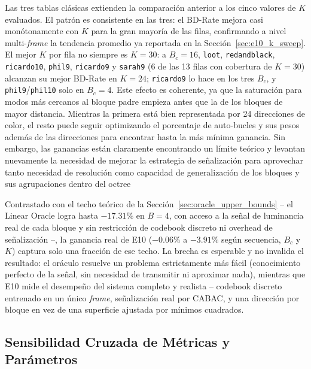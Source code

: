         Las tres tablas clásicas extienden la comparación anterior a los cinco valores de $K$
        evaluados. El patrón es consistente en las tres: el BD-Rate mejora casi monótonamente con
        $K$ para la gran mayoría de las filas, 
        confirmando a nivel multi-\textit{frame} la tendencia promedio ya reportada en la
        Sección~\ref{sec:e10_k_sweep}. El mejor $K$ por fila no siempre es $K=30$: a $B_c=16$, \texttt{loot}, \texttt{redandblack}, \texttt{ricardo10}, \texttt{phil9}, \texttt{ricardo9} y \texttt{sarah9} (6 de las 13 filas con cobertura de $K=30$) alcanzan su mejor BD-Rate en $K=24$; \texttt{ricardo9} lo hace en los tres $B_c$, y \texttt{phil9}/\texttt{phil10} solo en $B_c=4$. Este efecto es coherente, ya que la saturación para modos más cercanos al bloque padre empieza antes que la de los bloques de mayor distancia. Mientras la primera está bien representada por 24 direcciones de color, el resto puede seguir optimizando el porcentaje de auto-bucles y sus pesos además de las direcciones para encontrar hasta la más mínima ganancia. Sin embargo, las ganancias están claramente encontrando un límite teórico y levantan nuevamente la necesidad de mejorar la estrategia de señalización para aprovechar tanto necesidad de resolución como capacidad de generalización de los bloques y sus agrupaciones dentro del octree

        Contrastado con el techo teórico de la Sección~\ref{sec:oracle_upper_bounds} -- el
        Linear Oracle logra hasta $-17.31\%$ en $B=4$, con acceso a la señal de luminancia real
        de cada bloque y sin restricción de codebook discreto ni overhead de señalización --, la
        ganancia real de E10 ($-0.06\%$ a $-3.91\%$ según secuencia, $B_c$ y $K$) captura solo una
        fracción de ese techo. La brecha es esperable y no invalida el resultado: el oráculo
        resuelve un problema estrictamente más fácil (conocimiento perfecto de la señal, sin
        necesidad de transmitir ni aproximar nada), mientras que E10 mide el desempeño del
        sistema completo y realista -- codebook discreto entrenado en un único \textit{frame},
        señalización real por CABAC, y una dirección por bloque en vez de una superficie
        ajustada por mínimos cuadrados. 


    \subsection{Sensibilidad Cruzada de Métricas y Parámetros}
        \label{sec:e10_driver_corr}

